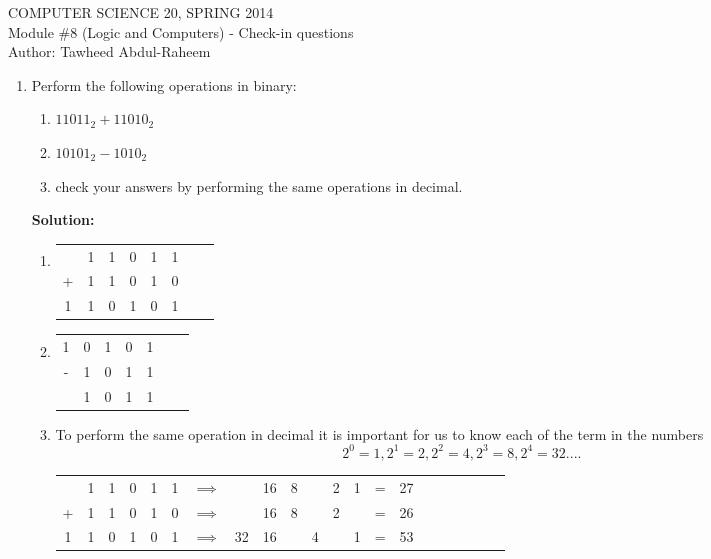 \documentclass[12pt]{article}
\begin{document}
\begin{center}
COMPUTER SCIENCE 20, SPRING 2014 \\
Module \#8 (Logic and Computers) - Check-in questions \\
Author: Tawheed Abdul-Raheem
\smallskip

\end{center}

\begin{enumerate}


\item
Perform the following operations in binary: 

\begin{enumerate}
		\item $11011_2 + 11010_2$
		
		\item $ 10101_2 -  1010_2$
		
		\item check your answers by performing the same operations in decimal.  

\end{enumerate}

        \textbf{Solution: } \\

        \begin{enumerate}
                \item
        \begin{tabular}{cccccccc}
           & 1 & 1 & 0 & 1 & 1 \\
          + & 1 & 1 & 0 & 1 & 0 \\
        \hline
          1 & 1 & 0 & 1 & 0 & 1  \\
        \end{tabular}

        \item
            \begin{tabular}{ccccccc}
                1 & 0 & 1 & 0 & 1 \\
                - & 1 & 0 & 1 & 1 \\
                \hline
                & 1 & 0 & 1 & 1 \\
                \end{tabular}
                \item
                    To perform the same operation in decimal it is important for us to know each of the term in the numbers
                    \[2^0 = 1, 2^1=2, 2^2=4, 2^3=8, 2^4=32 .... \]
                    \begin{tabular}{ccccccccccccccccccccc}
                       & 1 & 1 & 0 & 1 & 1 & $\implies$ &&16 & 8 & & 2 & 1 & = & 27\\
                      + & 1 & 1 & 0 & 1 & 0 & $ \implies$ && 16 & 8 & & 2 & & = & 26\\
                    \hline
                      1 & 1 & 0 & 1 & 0 & 1 &  $\implies$ &32 & 16  &  & 4 & & 1 & = & 53 \\
                    \end{tabular} \\


\end{enumerate}
\end{enumerate}
\end{document}
